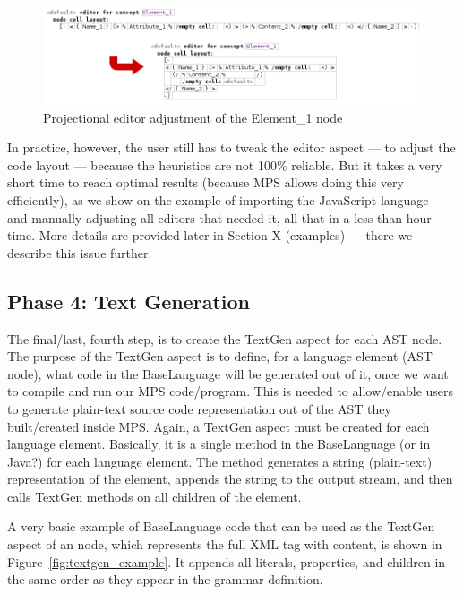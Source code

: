 \begin{figure}[ht]
	\centering
	\includegraphics[scale=0.5]{./images/editor_adjustment.png}
	\caption{Projectional editor adjustment of the Element{\_}1 node}
	\label{fig:editor_adjustment}
\end{figure}

In practice, however, the user still has to tweak the editor aspect --- to adjust the code layout --- because the heuristics are not 100\% reliable.
But it takes a very short time to reach optimal results (because MPS allows doing this very efficiently), as we show on the example of importing the JavaScript language~\cite{ref:javascript} and manually adjusting all editors that needed it, all that in a less than hour time.
More details are provided later in Section X (examples) --- there we describe this issue further.

\subsection{Phase 4: Text Generation}

The final/last, fourth step, is to create the TextGen aspect for each AST node.
The purpose of the TextGen aspect is to define, for a language element (AST node), what code in the BaseLanguage will be generated out of it, once we want to compile and run our MPS code/program.
This is needed to allow/enable users to generate plain-text source code representation out of the AST they built/created inside MPS.
Again, a TextGen aspect must be created for each language element.
Basically, it is a single method in the BaseLanguage (or in Java?) for each language element.
The method generates a string (plain-text) representation of the element, appends the string to the output stream, and then calls TextGen methods on all children of the element.

A very basic example of BaseLanguage code that can be used as the TextGen aspect of an  node, which represents the full XML tag with content, is shown in Figure~\ref{fig:textgen_example}.
It appends all literals, properties, and children in the same order as they appear in the grammar definition.

